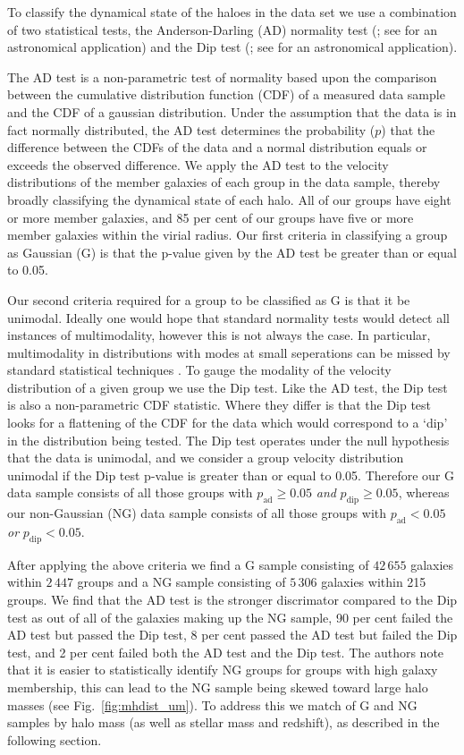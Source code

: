 \documentclass[a4paper,fleqn,usenatbib]{mnras}
\begin{document}
To classify the dynamical state of the haloes in the data set we use a
combination of two statistical tests, the Anderson-Darling (AD)
normality test (\citealt{anderson1952}; see \citealt{hou2009, hou2013}
for an astronomical application) and the Dip test
(\citealt{hartigan1985}; see \citealt{ribeiro2013} for an astronomical
application).
\par
The AD test is a non-parametric test of normality based
upon the comparison between the cumulative distribution function (CDF) of a
measured data sample and the CDF of a gaussian distribution.  Under
the assumption that the data is in fact normally distributed, the AD
test determines the probability ($p$) that the difference between
the CDFs of the data and a normal distribution equals or exceeds the
observed difference.  We apply the AD test to the velocity
distributions of the member galaxies of each group in the data sample,
thereby broadly classifying the dynamical state of each halo.  All of
our groups have eight or more member galaxies, and 85 per cent of our
groups have five or more member galaxies within the virial radius.  Our
first criteria in classifying a group as Gaussian (G) is that the p-value given
by the AD test be greater than or equal to 0.05.
\par
Our second criteria required for a
group to be classified as G is that it be unimodal.  Ideally one would
hope that standard normality tests would detect all instances of
multimodality, however this is not always the case.  In particular,
multimodality in distributions with modes at small seperations
can be missed by standard statistical techniques \citep{ashman1994}. To
gauge the modality of the velocity distribution of a given group we
use the Dip test.  Like the AD test, the Dip test is also a
non-parametric CDF statistic.  Where they differ is that the Dip test
looks for a flattening of the CDF for the data which would correspond
to a `dip' in the distribution being tested.  The Dip test operates
under the null hypothesis that the data is unimodal, and we consider a
group velocity distribution unimodal if the Dip test p-value is
greater than or equal to 0.05.  Therefore our G data sample consists
of all those groups with $p_{\text{ad}} \ge 0.05$
\emph{and} $p_{\text{dip}} \ge 0.05$, whereas our non-Gaussian (NG) data
sample consists of all those groups with $p_{\text{ad}} < 0.05$
\emph{or} $p_{\text{dip}} < 0.05$.
\par
After applying the above criteria we find a G sample consisting of
$42\,655$ galaxies within $2\,447$ groups and a NG sample consisting of $5\,306$
galaxies within 215 groups.  We find that the AD test is the stronger discrimator
compared to the Dip test as out of all of the galaxies making up the
NG sample, 90 per cent failed the AD test but passed the Dip test, 8
per cent passed the AD test but failed the Dip test, and 2 per cent
failed both the AD test and the Dip test.  The authors note that it is
easier to statistically identify NG groups for groups with high
galaxy membership, this can lead to the NG sample being skewed toward
large halo masses (see Fig.~\ref{fig:mhdist_um}).  To address this we
match of G and NG samples by halo mass (as well as stellar mass and
redshift), as described in the following section.
\end{document}

